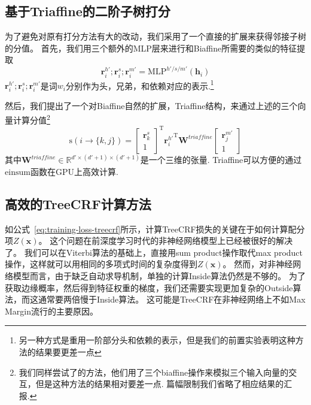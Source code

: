 \subsection{基于Triaffine的二阶子树打分}
为了避免对原有打分方法有大的改动，我们采用了一个直接的扩展来获得邻接子树的分值。
首先，我们用三个额外的MLP层来进行和Biaffine所需要的类似的特征提取
\begin{equation}
	\label{mlp-sib}
	\mathbf{r}_i^{h'}; \mathbf{r}_i^{s}; \mathbf{r}_i^{m'} =\mathrm{MLP}^{h'/s/m'} \left( \mathbf{h}_i \right)
\end{equation}
$\mathbf{r}_i^{h'}; \mathbf{r}_i^{s}; \mathbf{r}_i^{m'}$是词$w_i$分别作为头，兄弟，和依赖对应的表示.\footnote{
	另一种方式是重用一阶部分头和依赖的表示，但是我们的前置实验表明这种方法的结果要更差一点
}

然后，我们提出了一个对Biaffine自然的扩展，Triaffine结构，来通过上述的三个向量计算分值\footnote{
	我们同样尝试了\citet{wang-etal-2019-second}的方法，他们用了三个biaffine操作来模拟三个输入向量的交互，但是这种方法的结果相对要差一点.
	篇幅限制我们省略了相应结果的汇报.
}
\begin{equation} \label{eq:triaffine}
	\mathrm{s}(i\rightarrow \{k,j\}) =
	\left[
		\begin{array}{c}
			\mathbf{r}_{k}^{s} \\
			1                  
		\end{array}
	\right]^\mathrm{T}
	{\mathbf{r}_{i}^{h'}}^\mathrm{T}
	\mathbf{W}^\textit{triaffine}
	\left[
		\begin{array}{c}
			\mathbf{r}_{j}^{m'} \\
			1                   
		\end{array}
	\right]
\end{equation}
其中$\mathbf{W}^\textit{triaffine} \in \mathbb{R}^{d' \times (d'+1) \times (d'+1)}$是一个三维的张量.
Triaffine可以方便的通过$\mathrm{einsum}$函数在GPU上高效计算.

\subsection{高效的TreeCRF计算方法}

如公式~\ref{eq:training-loss-treecrf}所示，计算TreeCRF损失的关键在于如何计算配分项$Z(\boldsymbol{x})$。
这个问题在前深度学习时代的非神经网络模型上已经被很好的解决了。
我们可以在Viterbi算法的基础上，直接用sum product操作取代max product操作，这样就可以用相同的多项式时间的复杂度得到$Z(\boldsymbol{x})$。
然而，对非神经网络模型而言，由于缺乏自动求导机制，单独的计算Inside算法仍然是不够的。
为了获取边缘概率，然后得到特征权重的梯度，我们还需要实现更加复杂的Outside算法，而这通常要两倍慢于Inside算法。
这可能是TreeCRF在非神经网络上不如Max Margin流行的主要原因。

